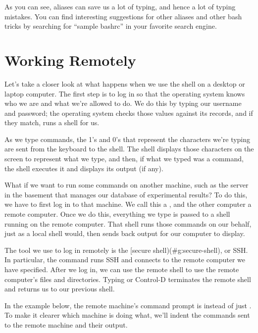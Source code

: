 As you can see, aliases can save us a lot of typing, and hence a lot of
typing mistakes. You can find interesting suggestions for other aliases
and other bash tricks by searching for ``sample bashrc'' in your
favorite search engine.

\section{Working Remotely}

Let's take a closer look at what happens when we use the shell on a
desktop or laptop computer. The first step is to log in so that the
operating system knows who we are and what we're allowed to do. We do
this by typing our username and password; the operating system checks
those values against its records, and if they match, runs a shell for
us.

As we type commands, the 1's and 0's that represent the characters we're
typing are sent from the keyboard to the shell. The shell displays those
characters on the screen to represent what we type, and then, if what we
typed was a command, the shell executes it and displays its output (if
any).

What if we want to run some commands on another machine, such as the
server in the basement that manages our database of experimental
results? To do this, we have to first log in to that machine. We call
this a , and the other computer a
remote computer. Once we do this, everything we type is passed to a
shell running on the remote computer. That shell runs those commands on
our behalf, just as a local shell would, then sends back output for our
computer to display.

The tool we use to log in remotely is the {[}secure
shell)(\#g:secure-shell), or SSH. In particular, the command
 runs SSH and connects to the remote
computer we have specified. After we log in, we can use the remote shell
to use the remote computer's files and directories. Typing 
or Control-D terminates the remote shell and returns us to our previous
shell.

In the example below, the remote machine's command prompt is
 instead of just \code{\$}. To make it
clearer which machine is doing what, we'll indent the commands sent to
the remote machine and their output.


